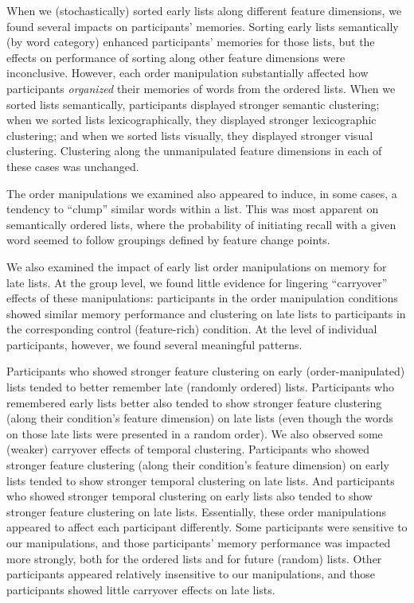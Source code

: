 \documentclass[11pt]{article}
\begin{document}
When we (stochastically) sorted early lists along different feature dimensions,
we found several impacts on participants' memories. Sorting early lists
semantically (by word category) enhanced participants' memories for those
lists, but the effects on performance of sorting along other feature dimensions
were inconclusive. However, each order manipulation substantially affected how
participants \textit{organized} their memories of words from the ordered lists.
When we sorted lists semantically, participants displayed stronger semantic
clustering; when we sorted lists lexicographically, they displayed stronger
lexicographic clustering; and when we sorted lists visually, they displayed
stronger visual clustering. Clustering along the unmanipulated feature
dimensions in each of these cases was unchanged.

The order manipulations we examined also appeared to induce, in some cases, a
tendency to ``clump'' similar words within a list. This was most apparent on
semantically ordered lists, where the probability of initiating recall with a
given word seemed to follow groupings defined by feature change points.

We also examined the impact of early list order manipulations on memory for
late lists. At the group level, we found little evidence for lingering
``carryover'' effects of these manipulations: participants in the order
manipulation conditions showed similar memory performance and clustering on
late lists to participants in the corresponding control (feature-rich)
condition. At the level of individual participants, however, we found several
meaningful patterns.

Participants who showed stronger feature clustering on early
(order-manipulated) lists tended to better remember late (randomly ordered)
lists. Participants who remembered early lists better also tended to show
stronger feature clustering (along their condition's feature dimension) on late
lists (even though the words on those late lists were presented in a random
order). We also observed some (weaker) carryover effects of temporal
clustering. Participants who showed stronger feature clustering (along their
condition's feature dimension) on early lists tended to show stronger temporal
clustering on late lists. And participants who showed stronger temporal
clustering on early lists also tended to show stronger feature clustering on
late lists. Essentially, these order manipulations appeared to affect each
participant differently. Some participants were sensitive to our manipulations,
and those participants' memory performance was impacted more strongly, both for
the ordered lists and for future (random) lists. Other participants appeared
relatively insensitive to our manipulations, and those participants showed
little carryover effects on late lists.
\end{document}
